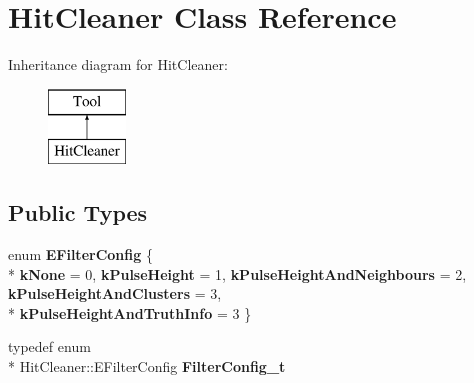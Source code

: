 \hypertarget{classHitCleaner}{\section{Hit\-Cleaner Class Reference}
\label{classHitCleaner}
}
Inheritance diagram for Hit\-Cleaner\-:\begin{figure}[H]
\begin{center}
\leavevmode
\includegraphics[height=2.000000cm]{classHitCleaner}
\end{center}
\end{figure}
\subsection*{Public Types}
\begin{DoxyCompactItemize}
\item 
enum {\bfseries E\-Filter\-Config} \{ \\*
{\bfseries k\-None} = 0, 
{\bfseries k\-Pulse\-Height} = 1, 
{\bfseries k\-Pulse\-Height\-And\-Neighbours} = 2, 
{\bfseries k\-Pulse\-Height\-And\-Clusters} = 3, 
\\*
{\bfseries k\-Pulse\-Height\-And\-Truth\-Info} = 3
 \}
\item 
\hypertarget{classHitCleaner_a417732ebe6c9a62f91a0648522cb5e01}{typedef enum \\*
Hit\-Cleaner\-::\-E\-Filter\-Config {\bfseries Filter\-Config\-\_\-t}}\label{classHitCleaner_a417732ebe6c9a62f91a0648522cb5e01}

\end{DoxyCompactItemize}
